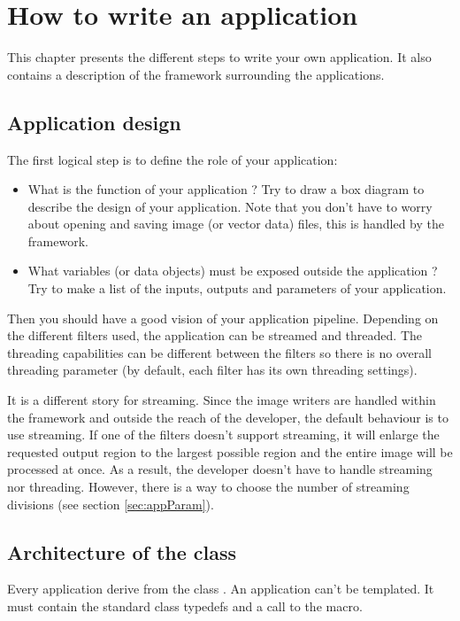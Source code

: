 \chapter{How to write an application}
\label{sec:writeAnApplication}

This chapter presents the different steps to write your own application.
It also contains a description of the framework surrounding the applications.

\section{Application design}
\label{sec:appDesign}
The first logical step is to define the role of your application:
\begin{itemize}
  \item What is the function of your application ? Try to draw a box diagram to 
  describe the design of your application. Note that you don't have to worry 
  about opening and saving image (or vector data) files, this is handled by the 
  framework.
  \item What variables (or data objects) must be exposed outside the application ?
  Try to make a list of the inputs, outputs and parameters of your application.
\end{itemize}
Then you should have a good vision of your application pipeline. Depending on the 
different filters used, the application can be streamed and threaded. The threading
capabilities can be different between the filters so there is no overall threading 
parameter (by default, each filter has its own threading settings). 

It is a different story for streaming. Since the image writers are handled within 
the framework and outside the reach of the developer, the default behaviour is to 
use streaming. If one of the filters doesn't support streaming, it will enlarge 
the requested output region to the largest possible region and the entire image 
will be processed at once. As a result, the developer doesn't have to handle  
streaming nor threading. However, there is a way to choose the number of streaming 
divisions (see section \ref{sec:appParam}).

\section{Architecture of the class}
\label{sec:appArchitecture}
Every application derive from the class . An 
application can't be templated. It must contain the standard class typedefs and
a call to the  macro.


